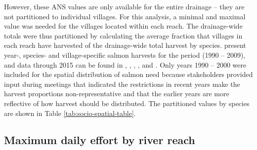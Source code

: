 \documentclass[12pt,]{book}
\theoremstyle{definition}
\theoremstyle{definition}
\theoremstyle{definition}
\theoremstyle{remark}
\begin{document}
However, these ANS values are only available for the entire drainage --
they are not partitioned to individual villages. For this analysis, a
minimal and maximal value was needed for the villages located within
each reach. The drainage-wide totals were thus partitioned by
calculating the average fraction that villages in each reach have
harvested of the drainage-wide total harvest by species.
\citet{hamazaki-2011} present year-, species- and village-specific
salmon harvests for the period (1990 -- 2009), and data through 2015 can
be found in \citet{carroll-hamazaki-2012}, \citet{shelden-etal-2014},
\citet{shelden-etal-2015}, \citet{shelden-etal-2016a}, and
\citet{shelden-etal-2016b}. Only years 1990 -- 2000 were included for
the spatial distribution of salmon need because stakeholders provided
input during meetings that indicated the restrictions in recent years
make the harvest proportions non-representative and that the earlier
years are more reflective of how harvest should be distributed. The
partitioned values by species are shown in Table
\ref{tab:socio-spatial-table}.

\subsection{Maximum daily effort by river reach}\label{mse-data-effort}
\end{document}

